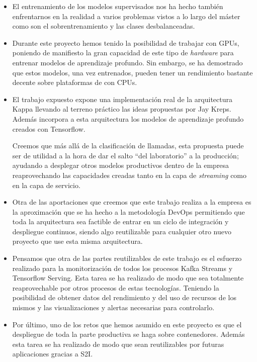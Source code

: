 \begin{itemize}
\item El entrenamiento de los modelos supervisados nos ha hecho también enfrentarnos en la realidad a varios problemas vistos a lo largo del máster como son el sobrentrenamiento y las clases desbalanceadas. 

\item Durante este proyecto hemos tenido la posibilidad de trabajar con GPUs, poniendo de manifiesto la gran capacidad de este tipo de \textit{hardware} para entrenar modelos de aprendizaje profundo. Sin embargo, se ha demostrado que estos modelos, una vez entrenados, pueden tener un rendimiento bastante decente sobre plataformas de con CPUs.



\item El trabajo expuesto expone una implementación real de la arquitectura Kappa llevando al terreno práctico las ideas propuestas por Jay Kreps. Además incorpora a esta arquitectura los modelos de aprendizaje profundo creados con Tensorflow. 

Creemos que más allá de la clasificación de llamadas, esta propuesta puede ser de utilidad a la hora de dar el salto ``del laboratorio'' a la producción; ayudando a desplegar otros modelos productivos dentro de la empresa reaprovechando las capacidades creadas tanto en la capa de \textit{streaming} como en la capa de servicio.    

\item Otra de las aportaciones que creemos que este trabajo realiza a la empresa es la aproximación que se ha hecho a la metodología DevOps permitiendo que toda la arquitectura sea factible de entrar en un ciclo de integración y despliegue continuos, siendo algo reutilizable para cualquier otro nuevo proyecto que use esta misma arquitectura. 

\item Pensamos que otra de las partes reutilizables de este trabajo es el esfuerzo realizado para la monitorización de todos los procesos Kafka Streams y Tensorflow Serving. Esta tarea se ha realizado de modo que sea totalmente reaprovechable por otros procesos de estas tecnologías. Teniendo la posibilidad de obtener datos del rendimiento y del uso de recursos de los mismos y las visualizaciones y alertas necesarias para controlarlo.

\item Por último, uno de los retos que hemos asumido en este proyecto es que el despliegue de toda la parte productiva se haga sobre contenedores. Además esta tarea se ha realizado de modo que sean reutilizables por futuras aplicaciones gracias a S2I.
\end{itemize}






 